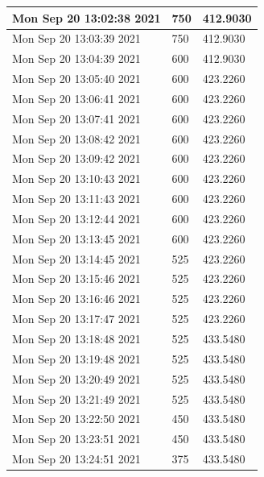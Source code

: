 \begin{longtable}{|l|l|l|}
Mon Sep 20 13:02:38 2021 &                750 &        412.9030 \\ \hline
Mon Sep 20 13:03:39 2021 &                750 &        412.9030 \\ \hline
Mon Sep 20 13:04:39 2021 &                600 &        412.9030 \\ \hline
Mon Sep 20 13:05:40 2021 &                600 &        423.2260 \\ \hline
Mon Sep 20 13:06:41 2021 &                600 &        423.2260 \\ \hline
Mon Sep 20 13:07:41 2021 &                600 &        423.2260 \\ \hline
Mon Sep 20 13:08:42 2021 &                600 &        423.2260 \\ \hline
Mon Sep 20 13:09:42 2021 &                600 &        423.2260 \\ \hline
Mon Sep 20 13:10:43 2021 &                600 &        423.2260 \\ \hline
Mon Sep 20 13:11:43 2021 &                600 &        423.2260 \\ \hline
Mon Sep 20 13:12:44 2021 &                600 &        423.2260 \\ \hline
Mon Sep 20 13:13:45 2021 &                600 &        423.2260 \\ \hline
Mon Sep 20 13:14:45 2021 &                525 &        423.2260 \\ \hline
Mon Sep 20 13:15:46 2021 &                525 &        423.2260 \\ \hline
Mon Sep 20 13:16:46 2021 &                525 &        423.2260 \\ \hline
Mon Sep 20 13:17:47 2021 &                525 &        423.2260 \\ \hline
Mon Sep 20 13:18:48 2021 &                525 &        433.5480 \\ \hline
Mon Sep 20 13:19:48 2021 &                525 &        433.5480 \\ \hline
Mon Sep 20 13:20:49 2021 &                525 &        433.5480 \\ \hline
Mon Sep 20 13:21:49 2021 &                525 &        433.5480 \\ \hline
Mon Sep 20 13:22:50 2021 &                450 &        433.5480 \\ \hline
Mon Sep 20 13:23:51 2021 &                450 &        433.5480 \\ \hline
Mon Sep 20 13:24:51 2021 &                375 &        433.5480 \\ \hline

\end{longtable}
